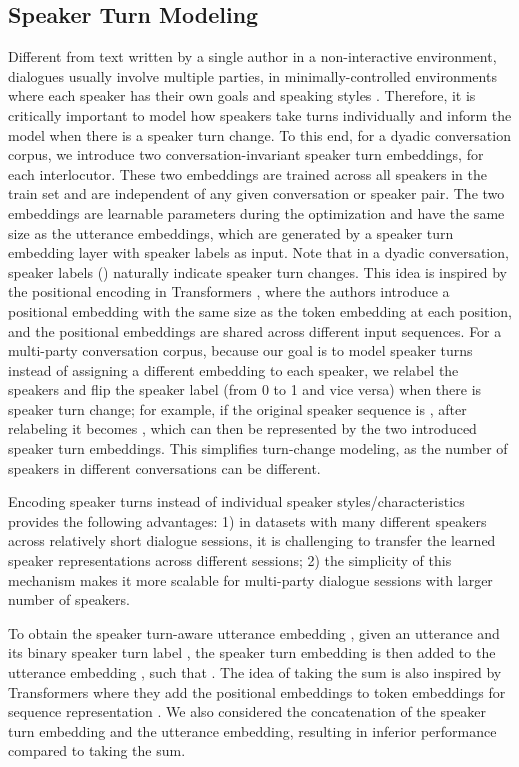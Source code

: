 \documentclass[11pt]{article}
\begin{document}
\subsection{Speaker Turn Modeling}
\label{sec:speaker-turn}
Different from text written by a single author in a non-interactive environment, dialogues usually involve multiple parties, in minimally-controlled environments where each speaker has their own goals and speaking styles \cite{chi2017speaker}. Therefore, it is critically important to model how speakers take turns individually and inform the model when there is a speaker turn change. To this end, for a dyadic conversation corpus, we introduce two conversation-invariant speaker turn embeddings, for each interlocutor. These two embeddings are trained across all speakers in the train set and are independent of any given conversation or speaker pair. The two embeddings are learnable parameters during the optimization and have the same size as the utterance embeddings, which are generated by a speaker turn embedding layer with speaker labels as input. Note that in a dyadic conversation, speaker labels () naturally indicate speaker turn changes.
This idea is inspired by the positional encoding in Transformers \cite{vaswani2017attention}, where the authors introduce a positional embedding with the same size as the token embedding at each position, and the positional embeddings are shared across different input sequences. 
For a multi-party conversation corpus, because our goal is to model speaker turns instead of assigning a different embedding to each speaker, we relabel the speakers and flip the speaker label (from 0 to 1 and vice versa) when there is speaker turn change; for example, if the original speaker sequence is , after relabeling it becomes , which can then be represented by the two introduced speaker turn embeddings. This simplifies turn-change modeling, as the number of speakers in different conversations can be different.

Encoding speaker turns instead of individual speaker styles/characteristics provides the following advantages: 1) in datasets with many different speakers across relatively short dialogue sessions, it is challenging to transfer the learned speaker representations across different sessions; 2) the simplicity of this mechanism makes it more scalable for multi-party dialogue sessions with larger number of speakers.


To obtain the speaker turn-aware utterance embedding , given an utterance  and its binary speaker turn label , the speaker turn embedding  is then added to the utterance embedding , such that
.
The idea of taking the sum is also inspired by Transformers where they add the positional embeddings to token embeddings for sequence representation \cite{vaswani2017attention}.
We also considered the concatenation of the speaker turn embedding and the utterance embedding, resulting in inferior performance compared to taking the sum.
\end{document}
